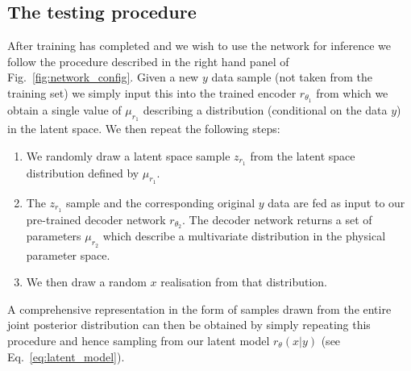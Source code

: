 \documentclass[%
showpacs,
nofootinbib,
 amsmath,amssymb,
 aps,
 twocolumn,
 prl,
 reprint,
floatfix,
]{revtex4-1}
\begin{document}
\subsection{The testing procedure}
%
%
After training has completed and we wish to use the network for inference we
follow the procedure described in the right hand panel of
Fig.~\ref{fig:network_config}. Given a new $y$ data sample (not taken from the
training set) we simply input this into the trained encoder $r_{\theta_1}$ from
which we obtain a single value of $\mu_{r_1}$ describing a distribution
(conditional on the data $y$) in the latent space. We then repeat the following
steps:

%
%
\begin{enumerate}
%
\item We randomly draw a latent space sample $z_{r_1}$ from the latent space
distribution defined by $\mu_{r_1}$.
%
\item The $z_{r_1}$ sample and the corresponding original $y$ data are fed as input to our
pre-trained decoder network $r_{\theta_2}$. The decoder network returns a set
of parameters $\mu_{r_2}$ which describe a multivariate distribution in the physical
parameter space.
%
\item We then draw a random $x$ realisation from that distribution.
%
\end{enumerate}
%

%
%
A comprehensive representation in the form of samples drawn from the entire
joint posterior distribution can then be obtained by simply repeating this
procedure and hence sampling from our latent model $r_{\theta}(x|y)$ (see
Eq.~\ref{eq:latent_model}).

\end{document}
